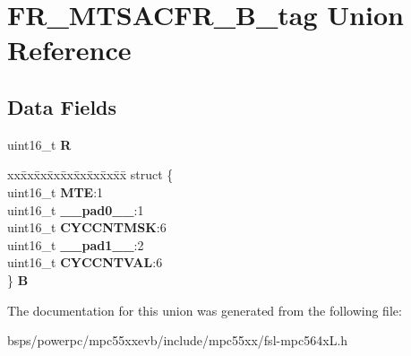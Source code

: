 \hypertarget{unionFR__MTSACFR__16B__tag}{}\section{F\+R\+\_\+\+M\+T\+S\+A\+C\+F\+R\+\_\+B\+\_\+tag Union Reference}
\label{unionFR__MTSACFR__16B__tag}
\subsection*{Data Fields}
\begin{DoxyCompactItemize}
\item 
\mbox{\label{unionFR__MTSACFR__16B__tag_a9e1fe9ed88d28ea17f95ffce4d326ef2}} 
uint16\+\_\+t {\bfseries R}
\item 
\mbox{\label{unionFR__MTSACFR__16B__tag_a273e455a47fe42e5027a0fe67b28fc76}} 
\begin{tabbing}
xx\=xx\=xx\=xx\=xx\=xx\=xx\=xx\=xx\=\kill
struct \{\\
\>uint16\_t {\bfseries MTE}:1\\
\>uint16\_t {\bfseries \_\_pad0\_\_}:1\\
\>uint16\_t {\bfseries CYCCNTMSK}:6\\
\>uint16\_t {\bfseries \_\_pad1\_\_}:2\\
\>uint16\_t {\bfseries CYCCNTVAL}:6\\
\} {\bfseries B}\\

\end{tabbing}\end{DoxyCompactItemize}


The documentation for this union was generated from the following file\+:\begin{DoxyCompactItemize}
\item 
bsps/powerpc/mpc55xxevb/include/mpc55xx/fsl-\/mpc564x\+L.\+h\end{DoxyCompactItemize}
